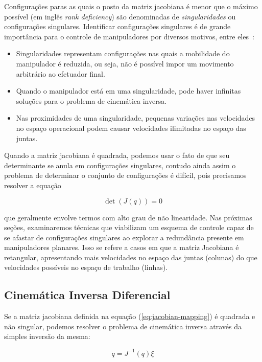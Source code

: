 Configurações paras as quais o posto da matriz jacobiana é menor que o máximo
possível (em inglês \emph{rank deficiency}) são denominadas de
\emph{singularidades} ou configurações singulares. Identificar configurações
singulares é de grande importância para o controle de manipuladores por
diversos motivos, entre eles~\cite[p. 122--123]{spong_robot_2020}:

\begin{itemize}
    \item Singularidades representam configurações nas quais a mobilidade do manipulador
          é reduzida, ou seja, não é possível impor um movimento arbitrário ao efetuador
          final.
    \item Quando o manipulador está em uma singularidade, pode haver infinitas soluções
          para o problema de cinemática inversa.
    \item Nas proximidades de uma singularidade, pequenas variações nas velocidades no
          espaço operacional podem causar velocidades ilimitadas no espaço das juntas.
\end{itemize}

Quando a matriz jacobiana é quadrada, podemos usar o fato de que seu
determinante se anula em configurações singulares, contudo ainda assim o
problema de determinar o conjunto de configurações é difícil, pois precisamos
resolver a equação

\begin{equation}
    \det(J(q)) = 0
\end{equation}

que geralmente envolve termos com alto grau de não linearidade. Nas próximas
seções, examinaremos técnicas que viabilizam um esquema de controle capaz de se
afastar de configurações singulares ao explorar a redundância presente em
manipuladores planares. Isso se refere a casos em que a matriz Jacobiana é
retangular, apresentando mais velocidades no espaço das juntas (colunas) do que
velocidades possíveis no espaço de trabalho (linhas).

\subsection{Cinemática Inversa Diferencial}

Se a matriz jacobiana definida na equação (\ref{eq:jacobian-mapping}) é
quadrada e não singular, podemos resolver o problema de cinemática inversa
através da simples inversão da mesma:

\begin{equation}\label{eq:resolved-rate}
    \dot{q} = J^{-1}(q) \xi
\end{equation}

